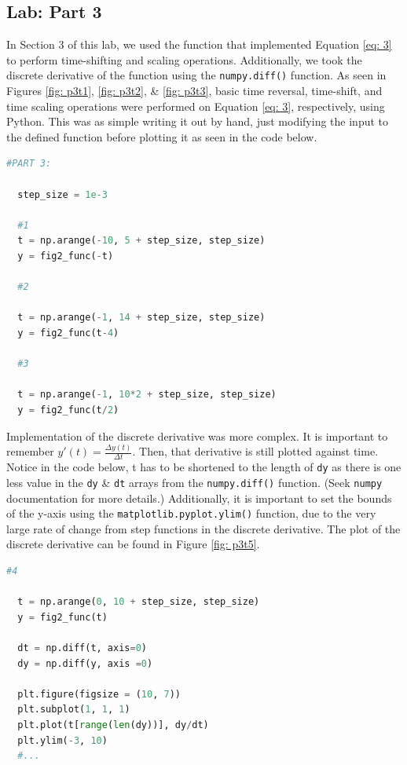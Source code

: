\documentclass[12pt]{report}
\begin{document}
\subsection{Lab: Part 3}
In Section 3 of this lab, we used the function that implemented Equation \eqref{eq: 3} to perform time-shifting and scaling operations. Additionally, we took the discrete derivative
of the function using the \texttt{numpy.diff()} function. As seen in Figures \ref{fig: p3t1}, \ref{fig: p3t2}, \& \ref{fig: p3t3}, basic time reversal, time-shift, and time scaling 
operations were performed on Equation \eqref{eq: 3}, respectively, using Python. This was as simple writing it out by hand, just modifying the input to the defined function before
plotting it as seen in the code below.
\begin{lstlisting}[language=Python, basicstyle=\footnotesize]
  #PART 3:
  
  step_size = 1e-3

  #1
  t = np.arange(-10, 5 + step_size, step_size)
  y = fig2_func(-t)

  #2

  t = np.arange(-1, 14 + step_size, step_size)
  y = fig2_func(t-4)

  #3

  t = np.arange(-1, 10*2 + step_size, step_size)
  y = fig2_func(t/2)
\end{lstlisting}
Implementation of the discrete derivative was more complex. It is important to remember $y'(t) = \frac{\Delta y(t)}{\Delta t}$. Then, that derivative is still plotted against time.
Notice in the code below, t has to be shortened to the length of \texttt{dy} as there is one less value in the \texttt{dy} \& \texttt{dt} arrays from the \texttt{numpy.diff()} function. 
(Seek \texttt{numpy} documentation for more details.) Additionally, it is important to set the bounds of the y-axis using the \texttt{matplotlib.pyplot.ylim()} function, due to the 
very large rate of change from step functions in the discrete derivative. The plot of the discrete derivative can be found in Figure \ref{fig: p3t5}.
\begin{lstlisting}[language=Python, basicstyle=\footnotesize]
  #4

  t = np.arange(0, 10 + step_size, step_size)
  y = fig2_func(t)

  dt = np.diff(t, axis=0)
  dy = np.diff(y, axis =0)     
  
  plt.figure(figsize = (10, 7))
  plt.subplot(1, 1, 1)
  plt.plot(t[range(len(dy))], dy/dt)
  plt.ylim(-3, 10)
  #...
\end{lstlisting}
\end{document}
